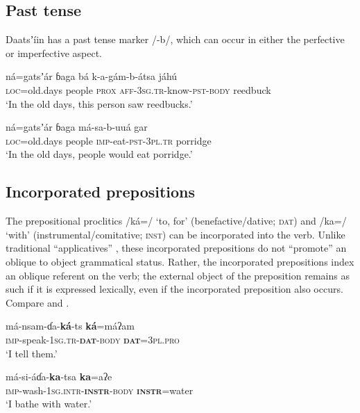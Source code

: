 \documentclass[output=paper]{langsci/langscibook}
\begin{document}
\subsection{Past tense}\label{sec:ahlandc:4.4}

Daatsʼíin has a past tense marker /-b/, which can occur in either the perfective  or imperfective  aspect.

\ea\label{ex:ahlandc:21}
\gll
ná=gatsʼár       ɓaga      bá  k-a-gám-b-átsa   jáhú \\
\textsc{loc}=old.days  people   \textsc{prox}   \textsc{aff-3sg.tr}{}-know-\textsc{pst-body}  reedbuck \\
\glt
‘In the old days, this person saw reedbucks.’
\z

\ea\label{ex:ahlandc:22}
\gll
ná=gatsʼár       ɓaga    má-sa-b-uuá  gar \\
\textsc{loc}=old.days   people \textsc{imp}{}-eat-\textsc{pst}{}-\textsc{3pl.tr}  porridge \\
\glt
‘In the old days, people would eat porridge.’
\z


\subsection{Incorporated prepositions}\label{sec:ahlandc:4.5}

The prepositional proclitics /ká=/ ‘to, for’ (benefactive/dative; \textsc{dat}) and /ka=/ ‘with’ (instrumental/comitative; \textsc{inst}) can be incorporated into the verb. Unlike traditional “applicatives” \citep{Payne1997}, these incorporated prepositions do not “promote” an oblique to object grammatical status. Rather, the incorporated prepositions index an oblique referent on the verb; the external object of the preposition remains as such if it is expressed lexically, even if the incorporated preposition also occurs. Compare  and . 

\ea\label{ex:ahlandc:23}
\gll
má-nsam-ɗa-\textbf{ká}{}-ts                      \textbf{ká}=máʔam \\
\textsc{imp}{}-speak-\textsc{1sg.tr-}\textbf{\textsc{dat}}\textsc{{}-body} \textbf{\textsc{dat}}\textsc{=3pl.pro} \\
\glt
‘I tell them.’
\z

\ea\label{ex:ahlandc:24}
\gll
má-si-áɗa-\textbf{ka}{}-tsa    \textbf{ka}=aʔe \\
\textsc{imp}{}-wash-\textsc{1sg.intr-}\textbf{\textsc{instr}}\textsc{{}-body} \textbf{\textsc{instr}}\textsc{=}water   \\
\glt
‘I bathe with water.’
\z
\end{document}
